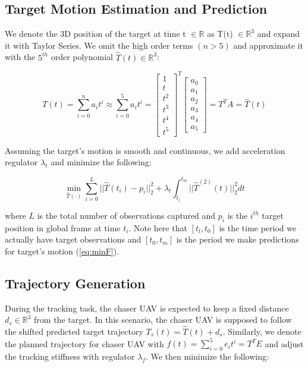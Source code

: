 \subsection{Target Motion Estimation and Prediction}

We denote the 3D position of the target at time t $\in \mathbb{R}$ as T(t) $\in \mathbb{R}^{3}$ and expand it with Taylor Series. We omit the high order terms $(n>5)$ and approximate it with the $5^{th}$ order polynomial $\hat{T}(t) \in \mathbb{R}^{3}$:

\begin{equation}\label{eq:poly5}
T(t) = \sum^n_{i=0} a_{i}t^i
\approx \sum^5_{i=0} a_{i}t^i
= \begin{bmatrix}1\\t\\t^2\\t^3\\t^4\\t^5\end{bmatrix}^T\begin{bmatrix}a_0\\a_1\\a_2\\a_3\\a_4\\a_5\end{bmatrix}
= T^TA = \hat{T}(t)
\end{equation}

\noindent
Assuming the target's motion is smooth and continuous, we add acceleration regulator $\lambda_{t}$ and minimize the following:

\begin{equation}\label{eq:minT}
\min_{\hat{T}(\cdot)} \sum^{L}_{i=0} ||\hat{T}(t_i)-p_i||^2_2 + \lambda_t\int_{t_l}^{t_m} ||\hat{T}^{(2)}(t)||^2_2dt
\end{equation}

\noindent
where $L$ is the total number of observations captured and $p_i$ is the $i^{th}$ target position in global frame at time $t_i$. Note here that $[t_l, t_0]$ is the time period we actually have target observations and $[t_0, t_m]$ is the period we make predictions for target's motion (\ref{eq:minF}).


\subsection{Trajectory Generation}

During the tracking task, the chaser UAV is expected to keep a fixed distance $d_s\in\mathbb{R}^{3}$ from the target. In this scenario, the chaser UAV is supposed to follow the shifted predicted target trajectory $T_s(t)=\hat{T}(t)+d_s$. Similarly, we denote the planned trajectory for chaser UAV with $f(t)=\sum^5_{i=0} e_{i}t^i=T^TE$ and adjust the tracking stiffness with regulator $\lambda_f$. We then minimize the following:

